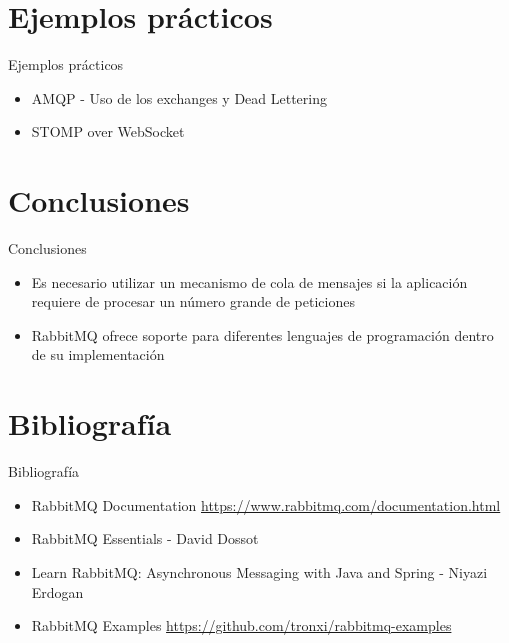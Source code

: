 \documentclass{beamer}
\begin{document}
  \section{Ejemplos prácticos}
  \begin{frame}{Ejemplos prácticos}
    \begin{itemize}
      \item AMQP - Uso de los exchanges y Dead Lettering
      \item STOMP over WebSocket
    \end{itemize}
  \end{frame}

  \section{Conclusiones}
  \begin{frame}{Conclusiones}
    \begin{itemize}
      \item Es necesario utilizar un mecanismo de cola de mensajes si
      la aplicación requiere de procesar un número grande de peticiones
      \item RabbitMQ ofrece soporte para diferentes lenguajes de programación
      dentro de su implementación
    \end{itemize}
  \end{frame}

  \section{Bibliografía}
  \begin{frame}{Bibliografía}
    \begin{itemize}
      \item RabbitMQ Documentation \url{https://www.rabbitmq.com/documentation.html}
      \item RabbitMQ Essentials - David Dossot
      \item Learn RabbitMQ: Asynchronous Messaging with Java and Spring - Niyazi Erdogan
      \item RabbitMQ Examples \url{https://github.com/tronxi/rabbitmq-examples}
    \end{itemize}
  \end{frame}
\end{document}
